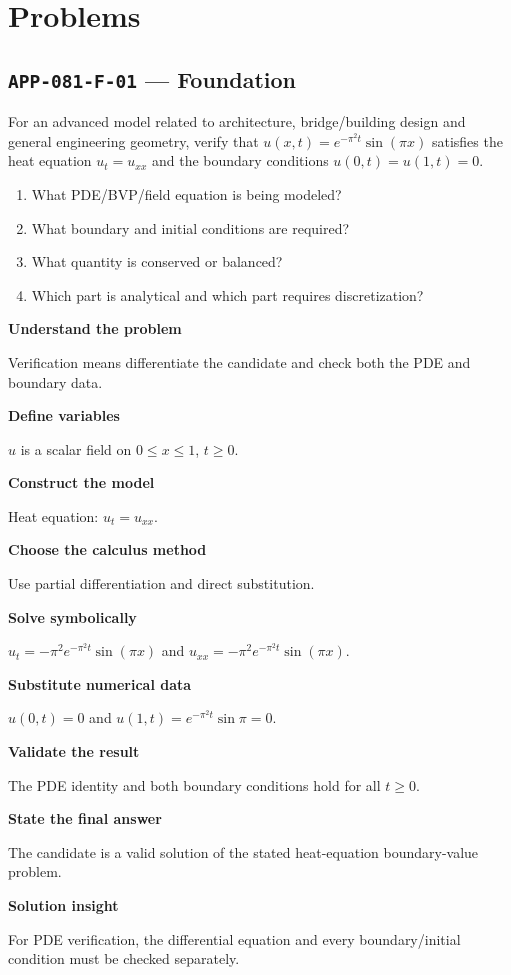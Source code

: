\documentclass[11pt]{book}
\newcommand{\pid}[1]{\texttt{#1}}
\begin{document}
\section*{Problems}
\subsection*{\pid{APP-081-F-01} — Foundation}
\begin{problembox}
For an advanced model related to architecture, bridge/building design and general engineering geometry, verify that $u(x,t)=e^{-\pi^2t}\sin(\pi x)$ satisfies the heat equation $u_t=u_{xx}$ and the boundary conditions $u(0,t)=u(1,t)=0$.
\end{problembox}
\begin{promptbox}\begin{enumerate}
\item What PDE/BVP/field equation is being modeled?
\item What boundary and initial conditions are required?
\item What quantity is conserved or balanced?
\item Which part is analytical and which part requires discretization?
\end{enumerate}\end{promptbox}
\begin{solutionbox}
\textbf{Understand the problem}\par Verification means differentiate the candidate and check both the PDE and boundary data.\par\medskip
\textbf{Define variables}\par $u$ is a scalar field on $0\le x\le1$, $t\ge0$.\par\medskip
\textbf{Construct the model}\par Heat equation: $u_t=u_{xx}$.\par\medskip
\textbf{Choose the calculus method}\par Use partial differentiation and direct substitution.\par\medskip
\textbf{Solve symbolically}\par $u_t=-\pi^2 e^{-\pi^2t}\sin(\pi x)$ and $u_{xx}=-\pi^2 e^{-\pi^2t}\sin(\pi x)$.\par\medskip
\textbf{Substitute numerical data}\par $u(0,t)=0$ and $u(1,t)=e^{-\pi^2t}\sin\pi=0$.\par\medskip
\textbf{Validate the result}\par The PDE identity and both boundary conditions hold for all $t\ge0$.\par\medskip
\textbf{State the final answer}\par The candidate is a valid solution of the stated heat-equation boundary-value problem.\par\medskip
\textbf{Solution insight}\par For PDE verification, the differential equation and every boundary/initial condition must be checked separately.\par\medskip
\end{solutionbox}
\end{document}

